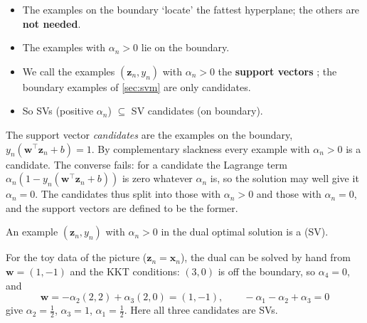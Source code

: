 \begin{center}
    \begin{minipage}[c]{0.56\textwidth}
        \begin{itemize}
            \item The examples on the boundary `locate' the fattest
                hyperplane; the others are \textbf{not needed}.
            \item The examples with \(\alpha_n > 0\) lie on the boundary.
            \item We call the examples \((\bm{z}_n, y_n)\) with
                \(\alpha_n > 0\) the \textbf{support vectors}
                ; the boundary examples of
                \autoref{sec:svm} are only candidates.
            \item So SVs (positive \(\alpha_n\)) \(\subseteq\) SV candidates
                (on boundary).
        \end{itemize}
    \end{minipage}%
    \hfill
    \begin{minipage}[c]{0.4\textwidth}
        \centering
        \svmtoysolution
    \end{minipage}
\end{center}

The support vector \emph{candidates} are the examples on the boundary, \(y_n (\bm{w}^\top \bm{z}_n + b) = 1\). By
complementary slackness every example with \(\alpha_n > 0\) is a candidate.
The converse fails: for a candidate the Lagrange term \(\alpha_n (1 - y_n
(\bm{w}^\top \bm{z}_n + b))\) is zero whatever \(\alpha_n\) is, so the
solution may well give it \(\alpha_n = 0\). The candidates thus split into
those with \(\alpha_n > 0\) and those with \(\alpha_n = 0\), and the support
vectors are defined to be the former.

\begin{definition}
    An example \((\bm{z}_n, y_n)\) with \(\alpha_n > 0\) in the dual optimal
    solution is a  (SV).
\end{definition}

For the toy data of the picture (\(\bm{z}_n = \bm{x}_n\)),
the dual can be solved by hand from \(\bm{w} = (1, -1)\) and the KKT
conditions: \((3, 0)\) is off the boundary, so \(\alpha_4 = 0\), and
\[
    \bm{w} = -\alpha_2 (2, 2) + \alpha_3 (2, 0) = (1, -1),
    \qquad -\alpha_1 - \alpha_2 + \alpha_3 = 0
\]
give \(\alpha_2 = \frac{1}{2}\), \(\alpha_3 = 1\), \(\alpha_1 = \frac{1}{2}\).
Here all three candidates are SVs.

